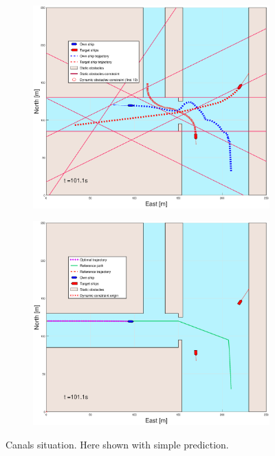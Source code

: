 \begin{figure}[ht]
\begin{subfigure}[b]{0.499\textwidth}
    \end{subfigure}
    \hfill
    \\
    \begin{subfigure}[b]{0.49\textwidth}
        \centering
        \includegraphics[width=\textwidth]{Images/Figures/Havn1/_Simple_1fig1_time=101}
    \end{subfigure}
    \hfill
    \begin{subfigure}[b]{0.499\textwidth}
        \centering
        \includegraphics[width=\textwidth]{Images/Figures/Havn1/_Simple_1fig999_time=101}
    \end{subfigure}
    \hfill
    \caption{Canals situation. Here shown with simple prediction.}
\end{figure}
